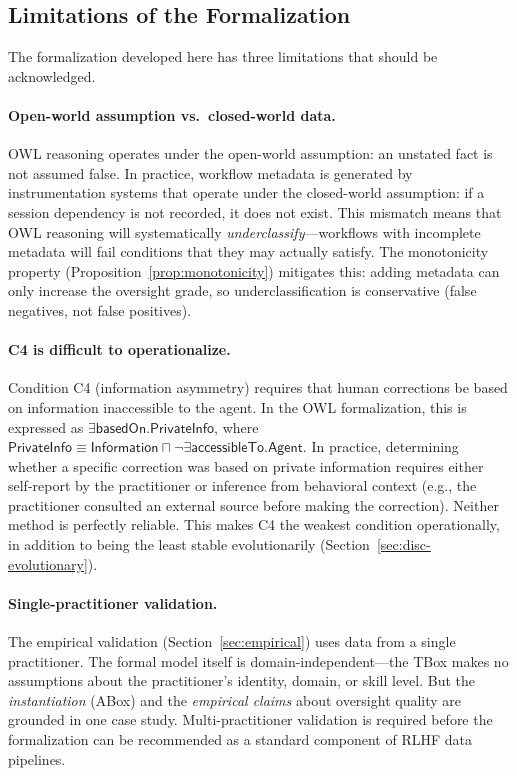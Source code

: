 \documentclass[11pt]{article}
\begin{document}
\subsection{Limitations of the Formalization}
\label{sec:disc-limitations}

The formalization developed here has three limitations that should be acknowledged.

\paragraph{Open-world assumption vs.\ closed-world data.}
OWL reasoning operates under the open-world assumption: an unstated fact is not assumed false.
In practice, workflow metadata is generated by instrumentation systems that operate under the closed-world assumption: if a session dependency is not recorded, it does not exist.
This mismatch means that OWL reasoning will systematically \emph{underclassify}---workflows with incomplete metadata will fail conditions that they may actually satisfy.
The monotonicity property (Proposition~\ref{prop:monotonicity}) mitigates this: adding metadata can only increase the oversight grade, so underclassification is conservative (false negatives, not false positives).

\paragraph{C4 is difficult to operationalize.}
Condition C4 (information asymmetry) requires that human corrections be based on information inaccessible to the agent.
In the OWL formalization, this is expressed as $\exists\mathsf{basedOn}.\mathsf{PrivateInfo}$, where $\mathsf{PrivateInfo} \equiv \mathsf{Information} \sqcap \neg\exists\mathsf{accessibleTo}.\mathsf{Agent}$.
In practice, determining whether a specific correction was based on private information requires either self-report by the practitioner or inference from behavioral context (e.g., the practitioner consulted an external source before making the correction).
Neither method is perfectly reliable.
This makes C4 the weakest condition operationally, in addition to being the least stable evolutionarily (Section~\ref{sec:disc-evolutionary}).

\paragraph{Single-practitioner validation.}
The empirical validation (Section~\ref{sec:empirical}) uses data from a single practitioner.
The formal model itself is domain-independent---the TBox makes no assumptions about the practitioner's identity, domain, or skill level.
But the \emph{instantiation} (ABox) and the \emph{empirical claims} about oversight quality are grounded in one case study.
Multi-practitioner validation is required before the formalization can be recommended as a standard component of RLHF data pipelines.
\end{document}
